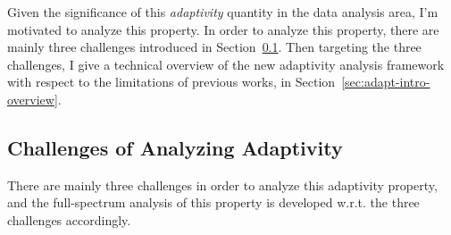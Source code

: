 Given the significance of this \emph{adaptivity} quantity in the data analysis area,
I'm motivated to analyze this property.
In order to analyze this property, there are mainly three challenges introduced in Section~\ref{sec:adapt-intro-challenge}.
Then targeting the three challenges, I give a technical overview of the new adaptivity analysis framework
with respect to the limitations of previous works, in Section~\ref{sec:adapt-intro-overview}.

\subsection{Challenges of Analyzing Adaptivity}
\label{sec:adapt-intro-challenge}
There are mainly three challenges in order to analyze this adaptivity property, 
and the full-spectrum analysis of this property is 
developed w.r.t. the three challenges accordingly.

